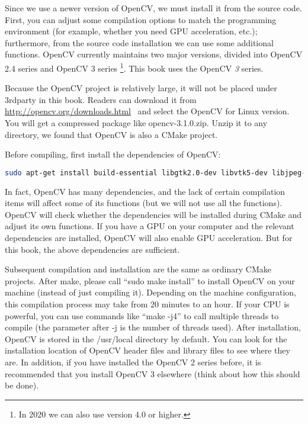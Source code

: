 Since we use a newer version of OpenCV, we must install it from the source code. First, you can adjust some compilation options to match the programming environment (for example, whether you need GPU acceleration, etc.); furthermore, from the source code installation we can use some additional functions. OpenCV currently maintains two major versions, divided into OpenCV 2.4 series and OpenCV 3 series \footnote{In 2020 we can also use version 4.0 or higher.}. This book uses the OpenCV \textit {3} series.

Because the OpenCV project is relatively large, it will not be placed under 3rdparty in this book. Readers can download it from ~ \url{http://opencv.org/downloads.html}~ and select the OpenCV for Linux version. You will get a compressed package like opencv-3.1.0.zip. Unzip it to any directory, we found that OpenCV is also a CMake project.

Before compiling, first install the dependencies of OpenCV:
\begin{lstlisting}[language=sh, caption=Terminal input:]
sudo apt-get install build-essential libgtk2.0-dev libvtk5-dev libjpeg-dev libtiff4-dev libjasper-dev libopenexr-dev libtbb-dev
\end{lstlisting}

In fact, OpenCV has many dependencies, and the lack of certain compilation items will affect some of its functions (but we will not use all the functions). OpenCV will check whether the dependencies will be installed during CMake and adjust its own functions. If you have a GPU on your computer and the relevant dependencies are installed, OpenCV will also enable GPU acceleration. But for this book, the above dependencies are sufficient.

Subsequent compilation and installation are the same as ordinary CMake projects. After make, please call ``sudo make install'' to install OpenCV on your machine (instead of just compiling it). Depending on the machine configuration, this compilation process may take from 20 minutes to an hour. If your CPU is powerful, you can use commands like ``make -j4'' to call multiple threads to compile (the parameter after -j is the number of threads used). After installation, OpenCV is stored in the /usr/local directory by default. You can look for the installation location of OpenCV header files and library files to see where they are. In addition, if you have installed the OpenCV 2 series before, it is recommended that you install OpenCV 3 elsewhere (think about how this should be done).

